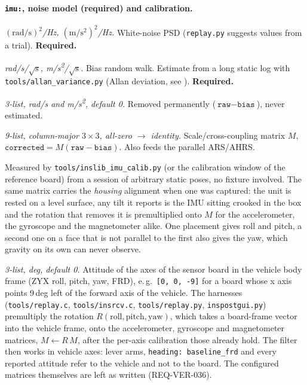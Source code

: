 \documentclass[11pt,a4paper]{article}
\newcommand{\code}[1]{\texttt{#1}}
\begin{document}
\paragraph{\code{imu:}, noise model (required) and calibration.}
\begin{description}\setlength\itemsep{0pt}
  \item[\code{gyr\_\allowbreak{}psd}, \code{acc\_\allowbreak{}psd}] \emph{$(\mathrm{rad/s})^2$/Hz,
    $(\mathrm{m/s^2})^2$/Hz.} White-noise PSD (\code{replay.py} suggests values
    from a trial). \textbf{Required.}
  \item[\code{gyr\_\allowbreak{}bias\_\allowbreak{}rw}, \code{acc\_\allowbreak{}bias\_\allowbreak{}rw}] \emph{rad/s/$\sqrt{\mathrm s}$,
    m/s\textsuperscript{2}/$\sqrt{\mathrm s}$.} Bias random walk. Estimate from a
    long static log with \code{tools/allan\_\allowbreak{}variance.py} (Allan
    deviation, see \cite{zwiener2019}). \textbf{Required.}
  \item[\code{gyr\_\allowbreak{}fixed\_\allowbreak{}bias}, \code{acc\_\allowbreak{}fixed\_\allowbreak{}bias}] \emph{3-list, rad/s and
    m/s\textsuperscript{2}, default 0.} Removed permanently ($\code{raw}-\code{bias}$),
    never estimated.
  \item[\code{gyr\_\allowbreak{}misalignment}, \code{acc\_\allowbreak{}misalignment}] \emph{9-list,
    column-major $3\times3$, all-zero $\to$ identity.} Scale/cross-coupling
    matrix $M$, $\code{corrected}=M(\code{raw}-\code{bias})$. Also feeds the
    parallel ARS/AHRS.

    Measured by \code{tools/inslib\_\allowbreak{}imu\_\allowbreak{}calib.py} (or the
    calibration window of the reference board) from a session of arbitrary static
    poses, no fixture involved. The same matrix carries the \emph{housing}
    alignment when one was captured: the unit is rested on a level surface,
    any tilt it reports is the IMU sitting crooked in the box and the
    rotation that removes it is premultiplied onto $M$ for the
    accelerometer, the gyroscope and the magnetometer alike. One placement
    gives roll and pitch, a second one on a face that is not parallel to the
    first also gives the yaw, which gravity on its own can never observe.
  \item[\code{mount\_\allowbreak{}rpy\_\allowbreak{}deg}] \emph{3-list, deg, default 0.} Attitude of
    the axes of the sensor board in the vehicle body frame (ZYX roll, pitch,
    yaw, FRD), e.\,g.\ \code{[0, 0, -9]} for a board whose x axis points
    9\,deg left of the forward axis of the vehicle. The harnesses
    (\code{tools/\allowbreak{}replay.c}, \code{tools/\allowbreak{}insrcv.c},
    \code{tools/\allowbreak{}replay.py}, \code{inspostgui.py}) premultiply the
    rotation $R(\text{roll},\text{pitch},\text{yaw})$, which takes a board-frame
    vector into the vehicle frame, onto the accelerometer, gyroscope and
    magnetometer matrices, $M \leftarrow R\,M$, after the per-axis
    calibration those already hold. The filter then works in vehicle axes:
    lever arms, \code{heading: baseline\_\allowbreak{}frd} and every reported
    attitude refer to the vehicle and not to the board. The configured
    matrices themselves are left as written (REQ-VER-036).


\end{description}
\end{document}
